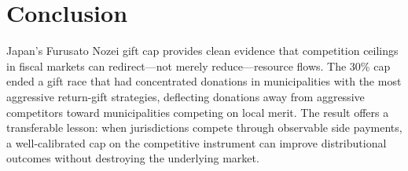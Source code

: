 \documentclass[12pt]{article}
\begin{document}
\section{Conclusion}

Japan's Furusato Nozei gift cap provides clean evidence that competition ceilings in fiscal markets can redirect---not merely reduce---resource flows. The 30\% cap ended a gift race that had concentrated donations in municipalities with the most aggressive return-gift strategies, deflecting donations away from aggressive competitors toward municipalities competing on local merit. The result offers a transferable lesson: when jurisdictions compete through observable side payments, a well-calibrated cap on the competitive instrument can improve distributional outcomes without destroying the underlying market.

\label{apep_main_text_end}

\newpage
\singlespacing


\newpage
\onehalfspacing



\end{document}
